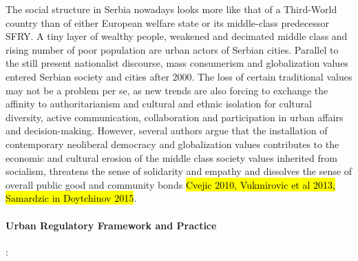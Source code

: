 \documentclass[11pt]{report}
\begin{document}
The social structure in Serbia nowadays looks more like that of a Third-World country than of either European welfare state or its middle-class predecessor SFRY.
A tiny layer of wealthy people, weakened and decimated middle class and rising number of poor population are urban actors of Serbian cities.
Parallel to the still present nationalist discourse, mass consumerism and globalization values entered Serbian society and cities after 2000.
The loss of certain traditional values may not be a problem per se, as new trends are also forcing to exchange the affinity to authoritarianism and cultural and ethnic isolation for cultural diversity, active communication, collaboration and participation in urban affairs and decision-making.
However, several authors argue that the installation of contemporary neoliberal democracy and globalization values contributes to the economic and cultural erosion of the middle class society values inherited from socialism, threatens the sense of solidarity and empathy and dissolves the sense of overall public good and community bonds \hl{Cvejic 2010, Vukmirovic et al 2013, Samardzic in Doytchinov 2015}.

\paragraph{Urban Regulatory Framework and Practice}:
\end{document}
